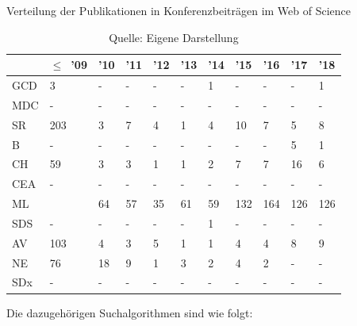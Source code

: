 \begin{table}
\caption{Verteilung der Publikationen in Konferenzbeiträgen im \glqq Web of Science\grqq}
\centering
\label{tab:dist_wos_proc}
\begin{tabularx}{\linewidth}{X|X|X|X|X|X|X|X|X|X|X}
	& $\leq$~'09 & '10 & '11 & '12 & '13 & '14 & '15 & '16 & '17 & '18 \\
	\hline
	GCD & 3 & - & - & - & - & 1 & - & - & - & 1 \\
	\hline
	MDC & - & - & - & - & - & - & - & - & - & - \\
	\hline
	SR & 203 & 3 & 7 & 4 & 1 & 4 & 10 & 7 & 5 & 8 \\
	\hline
	B & - & - & - & - & - & - & - & - & 5 & 1 \\
	\hline
	CH & 59 & 3 & 3 & 1 & 1 & 2 & 7 & 7 & 16 & 6 \\
	\hline
	CEA & - & - & - & - & - & - & - & - & - & - \\
	\hline
	ML & \numprint{2042} & 64 & 57 & 35 & 61 & 59 & 132 & 164 & 126 & 126 \\
	\hline
	SDS & - & - & - & - & - & 1 & - & - & - & - \\
	\hline
	AV & 103 & 4 & 3 & 5 & 1 & 1 & 4 & 4 & 8 & 9 \\
	\hline
	NE & 76 & 18 & 9 & 1 & 3 & 2 & 4 & 2 & - & - \\
	\hline
	SDx & - & - & - & - & - & - & - & - & - & - \\
\end{tabularx}
\caption*{Quelle: Eigene Darstellung}
\end{table}

Die dazugehörigen Suchalgorithmen sind wie folgt:

